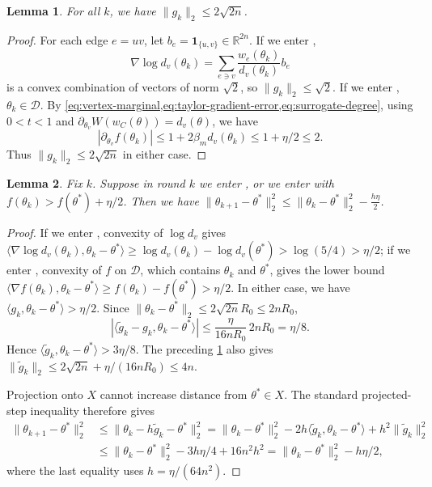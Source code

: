 \documentclass[11pt,reqno,letterpaper]{amsart}
\numberwithin{equation}{section}
\newtheorem{lemma}[lemma]{Lemma}
\theoremstyle{definition}
\theoremstyle{remark}
\newcommand{\R}{\mathbb R}
\begin{document}
\begin{lemma}\label{lem:gk2}
For all $k$, we have
    $\|g_k\|_2\leq 2\sqrt{2n}$.
\end{lemma}
\begin{proof}
For each edge $e=uv$, let $b_e=\mathbf 1_{\{u,v\}}\in\R^{2n}$.
If we enter ,
\[
 \nabla\log d_v(\theta_k)
 =\sum_{e\ni v}\frac{w_e(\theta_k)}{d_v(\theta_k)}b_e
\]
is a convex combination of vectors of norm $\sqrt2$, so
$\|g_k\|_2\le\sqrt2$. If we enter , $\theta_k\in\mathcal D$. By
\cref{eq:vertex-marginal,eq:taylor-gradient-error,eq:surrogate-degree},
using $0<t<1$ and
$\partial_{\theta_v}W(w_C(\theta))=d_v(\theta)$, we have
\[
 |\partial_{\theta_v}f(\theta_k)|
 \le1+2\beta_md_v(\theta_k)
 \le1+\eta/2\le2.
\]
Thus $\|g_k\|_2\le2\sqrt{2n}$ in either case.
\end{proof}


\begin{lemma}\label{obs:decrease}
Fix $k$. Suppose in round $k$ we enter , or we enter  with $f(\theta_k)>f(\theta^*)+\eta/2$. Then we have $\|\theta_{k+1}-\theta^*\|_2^2\leq \|\theta_{k}-\theta^*\|_2^2-\frac{h\eta}{2}$.
\end{lemma}
\begin{proof}
If we enter ,  convexity of $ \log d_v$ gives
$\langle \nabla \log d_v(\theta_k),\theta_k-\theta^*\rangle\geq \log d_v(\theta_k)-\log d_v(\theta^*)>\log(5/4)>\eta/2$;
if we enter , convexity of $f$ on $\mathcal D$, which contains
$\theta_k$ and $\theta^*$, gives the lower bound
$\langle \nabla f(\theta_k),\theta_k-\theta^*\rangle\geq f(\theta_k)-f(\theta^*)>\eta/2$. In either case, we have $\langle  g_k,\theta_k-\theta^*\rangle>\eta/2$.
Since $\|\theta_k-\theta^*\|_2\le2\sqrt{2n}R_0\le2nR_0$,
\[
 |\langle\widetilde g_k-g_k,\theta_k-\theta^*\rangle|
 \le\frac{\eta}{16nR_0}\,2nR_0=\eta/8.
\]
Hence $\langle\widetilde g_k,\theta_k-\theta^*\rangle>3\eta/8$.
The preceding \cref{lem:gk2} also gives
$\|\widetilde g_k\|_2\le2\sqrt{2n}+\eta/(16nR_0)\le4n$.

Projection onto $X$ cannot increase distance from $\theta^*\in X$.
The standard projected-step inequality
\cite[Section~6]{BoydSubgradient} therefore gives
\[
\begin{aligned}
 \|\theta_{k+1}-\theta^*\|_2^2
 &\le \|\theta_k-h\widetilde g_k-\theta^*\|_2^2= \|\theta_k-\theta^*\|_2^2
   -2h\langle\widetilde g_k,\theta_k-\theta^*\rangle
   +h^2\|\widetilde g_k\|_2^2\\
 &\le\|\theta_k-\theta^*\|_2^2-3h\eta/4+16n^2h^2
  =\|\theta_k-\theta^*\|_2^2-h\eta/2,
\end{aligned}
\]
where the last equality uses $h=\eta/(64n^2)$.
\end{proof}
\end{document}

